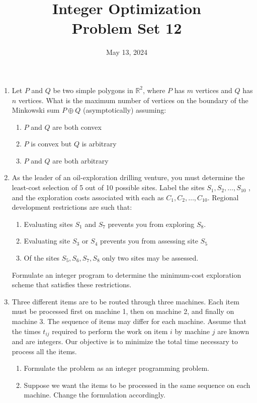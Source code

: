 \documentclass[11pt,a4paper]{article}
\title{Integer Optimization  \\ Problem Set 12 }
\date{ May 13, 2024}
\begin{document}
\maketitle 


\begin{enumerate}

\item Let $P$ and $Q$ be two simple polygons in $\mathbb{R}^2$, where $P$ has $m$ vertices and $Q$ has $n$ vertices. What is the maximum number of vertices on the boundary of the Minkowski sum $P ⊕ Q$ (asymptotically) assuming:
\begin{enumerate}
    \item $P$ and $Q$ are both convex
    \item $P$ is convex but $Q$ is arbitrary
    \item $P$ and $Q$ are both arbitrary
\end{enumerate}

\item As the leader of an oil-exploration drilling venture, you must determine the least-cost selection of 5 out of 10 possible sites. Label the sites $S_1 , S_2 ,\hdots, S_{10}$ , and the exploration costs associated with each as $C_1 ,C_2 ,\hdots,C_{10}$.
Regional development restrictions are such that:
\begin{enumerate}
    \item Evaluating sites $S_1$ and $S_7$ prevents you from exploring $S_8$.
    \item Evaluating site $S_3$ or $S_4$ prevents you from assessing site $S_5$
    \item Of the sites $S_5, S_6, S_7, S_8$ only two sites may be assessed. 
\end{enumerate}
Formulate an integer program to determine the minimum-cost exploration scheme that satisfies these restrictions.

\item Three different items are to be routed through three machines. Each item must be processed first on machine 1, then
on machine 2, and finally on machine 3. The sequence of items may differ for each machine. Assume that the times
$t_{ij}$ required to perform the work on item $i$ by machine $j$ are known and are integers. Our objective is to minimize the total time necessary to process all the items.
\begin{enumerate}
    \item Formulate the problem as an integer programming problem.
    \item Suppose we want the items to be processed in the same sequence on each machine. Change the formulation accordingly.
\end{enumerate}


\end{enumerate}
\end{document}
